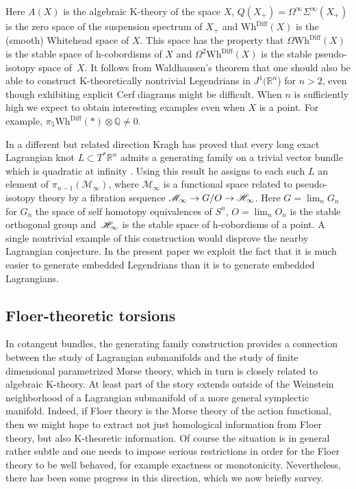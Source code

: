 \documentclass[11pt]{article}
\numberwithin{equation}{section}\providecommand{\dpl}{\displaystyle}
\let\mathcal\mathscr
\newcommand{\Diff}{\mathrm{Diff}}
\newcommand{\Wh}{\mathrm{Wh}}
\theoremstyle{plain}
\theoremstyle{definition}
\newcommand{\cM}{\mathcal{M}}\newcommand{\cN}{\mathcal{N}}
\newcommand{\bQ}{\mathbb{Q}}\newcommand{\bR}{\mathbb{R}}
\begin{document}
Here $A(X)$ is the algebraic K-theory of the space $X$, $Q(X_+)=\Omega^\infty \Sigma^\infty (X_+)$ is the zero space of the suspension spectrum of $X_+$ and $\Wh^{\Diff}(X)$ is the (smooth) Whitehead space of $X$. This space has the property that $\Omega \Wh^{\Diff}(X)$ is the stable space of h-cobordisms of $X$ and $\Omega^2\Wh^{\Diff}(X)$ is the stable pseudo-isotopy space of~$X$. It follows from Waldhausen's theorem that one should also be able to construct K\nobreakdash-theoretically nontrivial Legendrians in $J^1(\bR^n$) for $n>2$, even though exhibiting explicit Cerf diagrams might be difficult. When $n$ is sufficiently high we expect to obtain interesting examples even when $X$ is a point. For example, $\pi_5 \Wh^{\Diff }( \ast ) \otimes \bQ \neq 0$.

In a different but related direction Kragh has proved that every long exact Lagran\-gian knot $L \subset T^*\bR^n$ admits a generating family on a trivial vector bundle which is quadratic at infinity \cite{K18}. Using this result he assigns to each such $L$ an element of $\pi_{n-1}(\cM_\infty)$, where $\cM_\infty$ is a functional space related to pseudo-isotopy theory by a fibration sequence $\cM_\infty \to G/O \to \cH_\infty$. Here $G=\lim_n G_n$ for $G_n$ the space of self homotopy equivalences of $S^n$, $O=\lim_nO_n$ is the stable orthogonal group and~$\cH_\infty$ is the stable space of h-cobordisms of a point. A single nontrivial example of this construction would disprove the nearby Lagrangian conjecture. In the present paper we exploit the fact that it is much easier to generate embedded Legendrians than it is to generate embedded Lagrangians.

\subsection{Floer-theoretic torsions}
In cotangent bundles, the generating family construction provides a connection between the study of Lagrangian submanifolds and the study of finite dimensional parametrized Morse theory, which in turn is closely related to algebraic K-theory. At least part of the story extends outside of the Weinstein neighborhood of a Lagrangian submanifold of a more general symplectic manifold. \hbox{Indeed}, if Floer theory is the Morse theory of the action functional, then we might hope to extract not just homological information from Floer theory, but also K-theoretic information. Of course the situation is in general rather subtle and one needs to impose serious restrictions in order for the Floer theory to be well behaved, for example exactness or monotonicity. Nevertheless, there has been some progress in this direction, which we now briefly survey.
\end{document}
